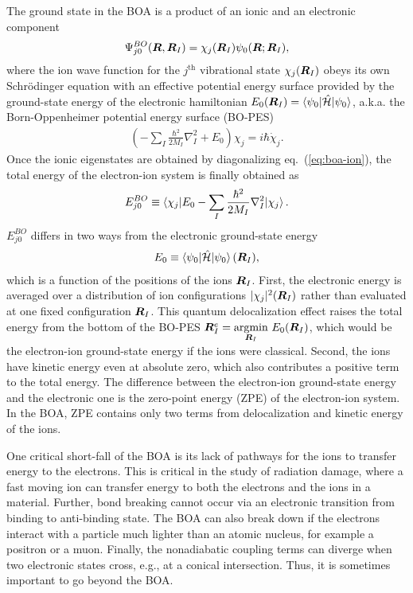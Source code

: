The ground state in the BOA is a product of an ionic and an electronic component
\begin{align}
\Psi_{j 0}^{BO}(\boldsymbol{R},\boldsymbol{R}_I) = \chi_j(\boldsymbol{R}_I) \psi_0(\boldsymbol{R};\boldsymbol{R}_I),
\end{align}
where the ion wave function for the $j^{\text{th}}$ vibrational state $\chi_j(\boldsymbol{R}_I)$ obeys its own Schr\"odinger equation with an effective potential energy surface provided by the ground-state energy of the electronic hamiltonian $E_0(\boldsymbol{R}_I) = \braket{\psi_0|\hat{\mathcal{H}}|\psi_0}$, a.k.a. the Born-Oppenheimer potential energy surface (BO-PES)
\begin{align} \label{eq:boa-ion}
\left(-\sum_I\frac{\hbar^2}{2M_I}\nabla^2_I+E_0\right)\chi_j = i\hbar\dot{\chi}_j.
\end{align}
Once the ionic eigenstates are obtained by diagonalizing eq.~(\ref{eq:boa-ion}), the total energy of the electron-ion system is finally obtained as
\begin{align}
E_{j0}^{BO} \equiv \braket{\chi_j| E_0 -\sum_I\frac{\hbar^2}{2M_I}\nabla^2_I |\chi_j}.
\end{align}
$E_{j0}^{BO}$ differs in two ways from the electronic ground-state energy
\begin{align}
E_0 \equiv \braket{\psi_0|\hat{\mathcal{H}}|\psi_0}(\boldsymbol{R}_I),
\end{align}
which is a function of the positions of the ions $\boldsymbol{R}_I$. First, the electronic energy is averaged over a distribution of ion configurations $\vert\chi_j\vert^2(\boldsymbol{R}_I)$ rather than evaluated at one fixed configuration $\boldsymbol{R}_I$. This quantum delocalization effect raises the total energy from the bottom of the BO-PES $\boldsymbol{R}_I^e=\underset{\boldsymbol{R}_I}{\text{argmin}}~E_0(\boldsymbol{R}_I)$, which would be the electron-ion ground-state energy if the ions were classical. Second, the ions have kinetic energy even at absolute zero, which also contributes a positive term to the total energy.
The difference between the electron-ion ground-state energy and the electronic one is the zero-point energy (ZPE) of the electron-ion system. In the BOA, ZPE contains only two terms from delocalization and kinetic energy of the ions.

One critical short-fall of the BOA is its lack of pathways for the ions to transfer energy to the electrons. This is critical in the study of radiation damage, where a fast moving ion can transfer energy to both the electrons and the ions in a material. Further, bond breaking cannot occur via an electronic transition from binding to anti-binding state. The BOA can also break down if the electrons interact with a particle much lighter than an atomic nucleus, for example a positron or a muon. Finally, the nonadiabatic coupling terms can diverge when two electronic states cross, e.g., at a conical intersection. Thus, it is sometimes important to go beyond the BOA.

